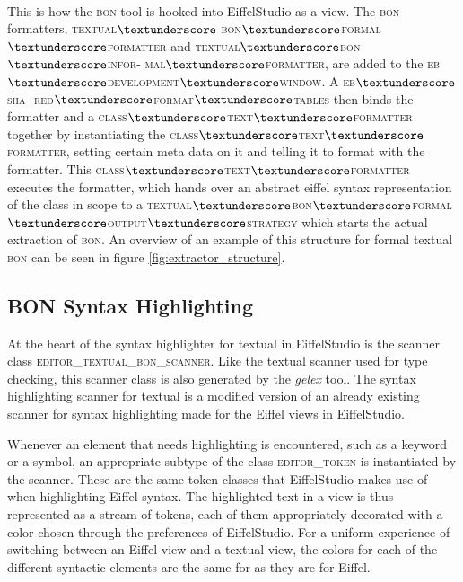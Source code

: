 \paragraph{}
This is how the \textsc{bon} tool is hooked into EiffelStudio as a view. The \textsc{bon} formatters, \textsc{textual$\textunderscore$ bon$\textunderscore$formal$\textunderscore$formatter} and \textsc{textual$\textunderscore$bon$\textunderscore$infor- mal$\textunderscore$formatter}, are added to the \textsc{eb$\textunderscore$development$\textunderscore$window}. A \textsc{eb$\textunderscore$sha- red$\textunderscore$format$\textunderscore$tables} then binds the formatter and a \textsc{class$\textunderscore$text$\textunderscore$formatter} together by instantiating the \textsc{class$\textunderscore$text$\textunderscore$formatter}, setting certain meta data on it and telling it to format with the formatter. This \textsc{class$\textunderscore$text$\textunderscore$formatter} executes the formatter, which hands over an abstract eiffel syntax representation of the class in scope to a \textsc{textual$\textunderscore$bon$\textunderscore$formal$\textunderscore$output$\textunderscore$strategy} which starts the actual extraction of \textsc{bon}. An overview of  an example of this structure for formal textual \textsc{bon} can be seen in figure \ref{fig:extractor_structure}.

\subsection{BON Syntax Highlighting}
At the heart of the syntax highlighter for textual \bon{} in EiffelStudio is the scanner class \textsc{editor\_textual\_bon\_scanner}. Like the textual \bon{} scanner used for type checking, this scanner class is also generated by the \textit{gelex} tool. The syntax highlighting scanner for textual \bon{} is a modified version of an already existing scanner for syntax highlighting made for the Eiffel views in EiffelStudio. 

Whenever an element that needs highlighting is encountered, such as a keyword or a symbol, an appropriate subtype of the class \textsc{editor\_token} is instantiated by the scanner. These are the same token classes that EiffelStudio makes use of when highlighting Eiffel syntax. The highlighted text in a view is thus represented as a stream of tokens, each of them appropriately decorated with a color chosen through the preferences of EiffelStudio. For a uniform experience of switching between an Eiffel view and a textual \bon{} view, the colors for each of the different syntactic elements are the same for \bon{} as they are for Eiffel.

